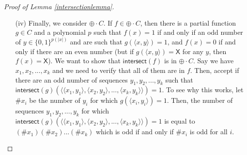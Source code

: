 \documentclass[11pt]{article}
\newcommand{\bp}{\textsf{BP}}
\newcommand{\parity}{\oplus}
\newcommand{\x}{\textsf{X}}
\newcommand{\intersect}{\textsf{intersect}}
\newcommand{\majority}{\textsf{majority}}
\begin{document}
\begin{proof}[Proof of Lemma \ref{intersectionlemma}]
\begin{enumerate}
By assumption, $C$ is closed under majority reductions and under intersection. Thus,\linebreak $\intersect(\majority(g)) \in C$. We want to show that $\intersect(f) \in \bp\cdot C$. For any $(x_1,x_2,...,x_k)$, we randomly choose random strings $y_{i,j}$ of length $p(|x_i|)$, for $1\le i\le k$ and $j\le 1\le \ell$, where $\ell = \lceil -48\ln(1 - (2/3)^{1/k}) \rceil$. Then, we check $\intersect(\majority(g))(\langle X_1, X_2, ..., X_k\rangle)$, where
\begin{center}
$X_i = \langle\langle x_i,y_{i,1}\rangle,\langle x_{i},y_{i,2}\rangle,...,\langle x_{i},y_{i,\ell}\rangle\rangle$.
\end{center}
By the Chernoff bound, as in the proof of Lemma \ref{majorityimpliesamplify}, we have that $\majority(M)(X_i) = f(x_i)$ with probability greater than $e^{-(1/4)^2 (2\ell/3)/2} \ge 1 - (2/3)^{1/k}$. If $f(x_i) = 1$ for all $i$, then the probability that there exists some $i$ for which $\majority(g)(X_i) \ne 1$ is therefore greater than $((2/3)^{1/k})^k = 2/3$. If there is some $i$ for which $f(x_i) = 0$, then there is a $1 - (2/3)^{1/k} \ge 2/3$ chance that $\majority(g)(X_i) = 0$.

Thus, we get that $\intersect(\majority(g))(\langle X_1,...,X_k\rangle) = \intersect(f)(\langle x_1,...,x_k\rangle)$ with probability at least $2/3$. Therefore, since $\intersect(\majority(g)) \in C$, we get that $\intersect(f) \in \bp \cdot C$, so $\bp \cdot C$ is closed under intersection.


\item[(iv)] Finally, we consider $\parity \cdot C$. If $f \in \parity \cdot C$, then there is a partial function $g \in C$ and a polynomial $p$ such that $f(x) = 1$ if and only if an odd number of $y \in \{0,1\}^{p(|x|)}$ and are such that $g(\langle x, y\rangle) = 1$, and $f(x) = 0$ if and only if there are an even number (but if $g(\langle x,y\rangle) = \x$ for any $y$, then $f(x) = \x$). We want to show that $\intersect(f)$ is in $\parity \cdot C$. Say we have $x_1,x_2,...,x_k$ and we need to verify that all of them are in $f$. Then, accept if there are an odd number of sequences $y_1,y_2,...,y_k$ such that $\intersect(g)(\langle\langle x_1,y_1\rangle,\langle x_2,y_2\rangle,...,\langle x_k,y_k\rangle\rangle) = 1$. To see why this works, let $\# x_i$ be the number of $y_i$ for which $g(\langle x_i,y_i\rangle) = 1$. Then, the number of sequences $y_1,y_2,...,y_k$ for which $\intersect(g)(\langle\langle x_1,y_1\rangle,\langle x_2,y_2\rangle,...,\langle x_k,y_k\rangle\rangle) = 1$ is equal to $(\# x_1)(\# x_2)...(\# x_k)$ which is odd if and only if $\# x_i$ is odd for all $i$.
\end{enumerate}
\end{proof}
\end{document}
